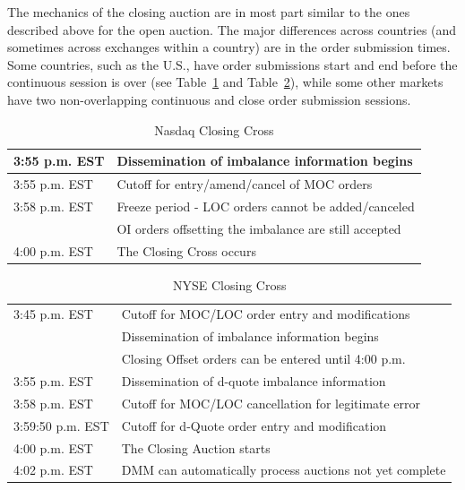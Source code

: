 The mechanics of the closing auction are in most part similar to the ones described above for the open auction. The major differences across countries (and sometimes across exchanges within a country) are in the order submission times. Some countries, such as the U.S., have order submissions start and end before the continuous session is over (see Table~\ref{tab:NASDAQclose} and Table~\ref{tab:NYSEclose}), while some other markets have two non-overlapping continuous and close order submission sessions.

	\begin{table}[!ht]
   	\centering
   	\caption{Nasdaq Closing Cross\label{tab:NASDAQclose}}
   	\begin{tabular}{ll} 
	3:55 p.m. EST & Dissemination of imbalance information begins  \\ \hline
	3:55 p.m. EST & Cutoff for entry/amend/cancel of MOC orders\\ \hline
	3:58 p.m. EST & Freeze period - LOC orders cannot be added/canceled  \\ 
	 & OI orders offsetting the imbalance are still accepted   \\ \hline	
	4:00 p.m. EST & The Closing Cross occurs		
  	 \end{tabular}
	\end{table}	


	\begin{table}[!ht]
   	\centering
   	\caption{NYSE Closing Cross\label{tab:NYSEclose}}
   	\begin{tabular}{ll} 
	3:45 p.m. EST & Cutoff for MOC/LOC order entry and modifications  \\ 
     	& Dissemination of imbalance information begins \\
	& Closing Offset orders can be entered until 4:00 p.m.  \\ \hline	 
	3:55 p.m. EST &  Dissemination of d-quote imbalance information\\ \hline
	3:58 p.m. EST & Cutoff for MOC/LOC cancellation for legitimate error \\ \hline
	3:59:50 p.m. EST & Cutoff for d-Quote order entry and modification \\ \hline
	4:00 p.m. EST & The Closing Auction starts \\ \hline
	4:02 p.m. EST & DMM can automatically process auctions not yet complete
   	\end{tabular}
	\end{table}	


